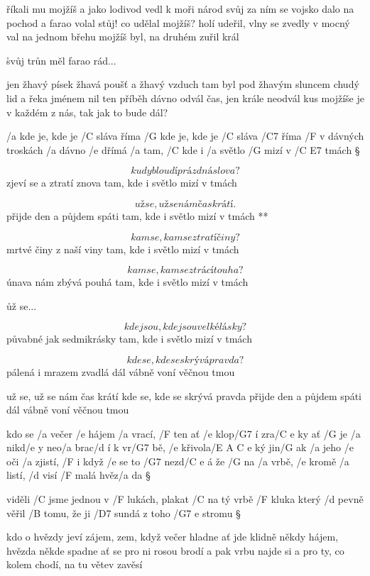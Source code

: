 říkali mu mojžíš a jako lodivod vedl k moři národ svůj
za ním se vojsko dalo na pochod a farao volal stůj! \s
co udělal mojžíš? holí udeřil, vlny se zvedly v mocný val
na jednom břehu mojžíš byl, na druhém zuřil král \s

\r svůj trůn měl farao rád...

jen žhavý písek žhavá poušť a žhavý vzduch tam byl
pod žhavým sluncem chudý lid a řeka jménem nil \s
ten příběh dávno odvál čas, jen krále neodvál
kus mojžíše je v každém z nás, tak jak to bude dál?




/a kde je, kde je /C sláva říma
/G kde je, kde je /C sláva /C7 říma
/F v dávných troskách /a dávno /e dřímá
/a tam, /C kde i /a světlo /G mizí v /{C E7} tmách \S

\[ kudy bloudí prázdná slova? \]
zjeví se a ztratí znova
tam, kde i světlo mizí v tmách \s

\R \[ už se, už se nám čas krátí. \]
   přijde den a půjdem spáti
   tam, kde i světlo mizí v tmách **

\[ kam se, kam se ztratí činy? \]
mrtvé činy z naší viny
tam, kde i světlo mizí v tmách \s

\[ kam se, kam se ztrácí touha? \]
únava nám zbývá pouhá
tam, kde i světlo mizí v tmách \s

\r už se...

\[ kde jsou, kde jsou velké lásky? \]
půvabné jak sedmikrásky
tam, kde i světlo mizí v tmách \s

\[ kde se, kde se skrývá pravda? \]
pálená i mrazem zvadlá
dál vábně voní věčnou tmou \s

už se, už se nám čas krátí
kde se, kde se skrývá pravda
přijde den a půjdem spáti
dál vábně voní věčnou tmou




kdo se /a večer /e hájem /a vrací, /F ten ať /e klop/G7 í zra/{C e} ky
ať /G je /a nikd/e y neo/a brac/d í k vr/G7 bě, /e křivola/{E A C e} ký
jin/G ak /a jeho /e oči /a zjistí, /F i když /e se to /G7 nezd/{C e} á
že /G na /a vrbě, /e kromě /a listí, /d visí /F malá hvěz/a da \S

viděli /C jsme jednou v /F lukách, plakat /C na tý vrbě /F kluka
který /d pevně věřil /B tomu, že ji /D7 sundá z toho /{G7 e} stromu \S

kdo o hvězdy jeví zájem, zem, když večer hladne
ať jde klidně někdy hájem, hvězda někde spadne
ať se pro ni rosou brodí a pak vrbu najde si
a pro ty, co kolem chodí, na tu větev zavěsí



